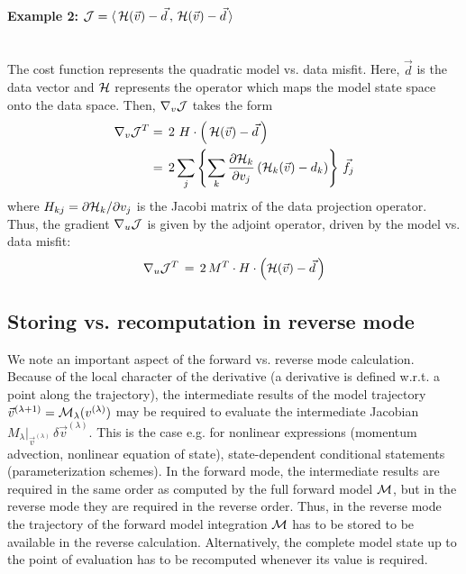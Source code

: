 \paragraph{Example 2: 
$ {\cal J} = \langle \, {\cal H}(\vec{v}) - \vec{d} \, , 
 \, {\cal H}(\vec{v}) - \vec{d} \, \rangle $} ~ \\
The cost function represents the quadratic model vs. data misfit.
Here, $ \vec{d} $ is the data vector and $ {\cal H} $ represents the
operator which maps the model state space onto the data space.
Then, $ \nabla_v {\cal J} $ takes the form
%
\begin{equation*}
\begin{aligned}
\nabla_v {\cal J}^T & = \, 2 \, \, H \cdot 
\left( \, {\cal H}(\vec{v}) - \vec{d} \, \right) \\
~          & = \, 2 \sum_{j} \left\{ \sum_k
\frac{\partial {\cal H}_k}{\partial v_{j}} 
\left( {\cal H}_k (\vec{v}) - d_k \right)
\right\} \, {\vec{f}_{j}} \\
\end{aligned}
\end{equation*}
%
where $H_{kj} = \partial {\cal H}_k / \partial v_{j} $ is the 
Jacobi matrix of the data projection operator.
Thus, the gradient $ \nabla_u {\cal J} $ is given by the 
adjoint operator,
driven by the model vs. data misfit:
\[
\nabla_u {\cal J}^T \, = \, 2 \, M^T \cdot 
H \cdot \left( {\cal H}(\vec{v}) - \vec{d} \, \right)
\]

\subsection{Storing vs. recomputation in reverse mode}
\label{checkpointing}

We note an important aspect of the forward vs. reverse 
mode calculation.
Because of the local character of the derivative
(a derivative is defined w.r.t. a point along the trajectory),
the intermediate results of the model trajectory
$\vec{v}^{(\lambda+1)}={\cal M}_{\lambda}(v^{(\lambda)})$ 
may be required to evaluate the intermediate Jacobian 
$M_{\lambda}|_{\vec{v}^{(\lambda)}} \, \delta \vec{v}^{(\lambda)} $.
This is the case e.g. for nonlinear expressions
(momentum advection, nonlinear equation of state), state-dependent
conditional statements (parameterization schemes).
In the forward mode, the intermediate results are required
in the same order as computed by the full forward model ${\cal M}$,
but in the reverse mode they are required in the reverse order.
Thus, in the reverse mode the trajectory of the forward model
integration ${\cal M}$ has to be stored to be available in the reverse
calculation. Alternatively, the complete model state up to the
point of evaluation has to be recomputed whenever its value is required.


